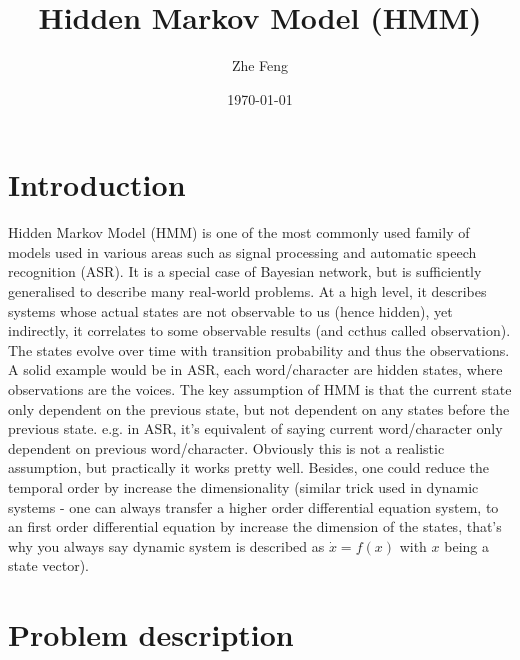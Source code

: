 \documentclass{article} [10pt] %
\title{Hidden Markov Model (HMM)}
\author{Zhe Feng}
\date{\today}
\begin{document}
\noindent
\maketitle
\section{Introduction}
Hidden Markov Model (HMM) is one of the most commonly used family of models used in various areas such as signal processing and automatic speech recognition (ASR). It is a special case of Bayesian network, but is sufficiently generalised to describe many real-world problems. At a high level, it describes systems whose actual states are not observable to us (hence hidden), yet indirectly, it correlates to some observable results (and ccthus called observation). The states evolve over time with transition probability and thus the observations. A solid example would be in ASR, each word/character are hidden states, where observations are the voices. The key assumption of HMM is that the current state only dependent on the previous state, but not dependent on any states before the previous state. e.g. in ASR, it's equivalent of saying current word/character only dependent on previous word/character. Obviously this is not a realistic assumption, but practically it works pretty well. Besides, one could reduce the temporal order by increase the dimensionality (similar trick used in dynamic systems - one can always transfer a higher order differential equation system, to an first order differential equation by increase the dimension of the states, that's why you always say dynamic system is described as $\dot x = f(x)$ with $x$ being a state vector).




\section{Problem description}	\label{sec:problem_ddescription}
\end{document}
